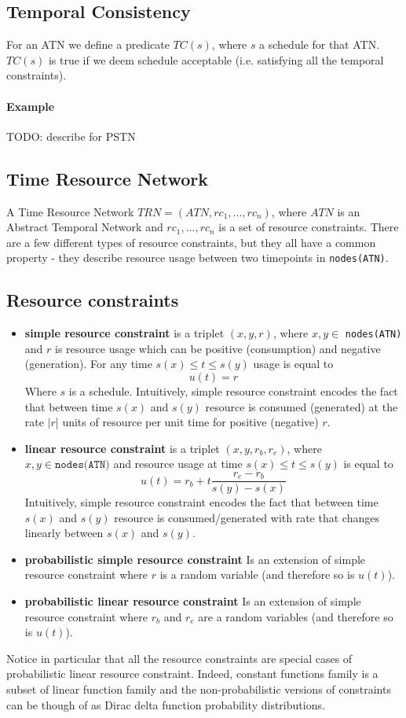 \documentclass{article}
\begin{document}
\begin{multicols}{2}
\subsection{Temporal Consistency}
For an ATN we define a predicate $TC(s)$, where $s$ a schedule for that ATN. $TC(s)$ is true if we deem schedule acceptable (i.e. satisfying all the temporal constraints).
\paragraph{Example} TODO: describe for PSTN
\subsection{Time Resource Network}
A Time Resource Network $TRN = (ATN, {rc_1, ..., rc_n})$, where $ATN$ is an Abstract Temporal Network and ${rc_1, ..., rc_n}$ is a set of resource constraints. There are a few different types of resource constraints, but they all have a common property - they describe resource usage between two timepoints in \texttt{nodes(ATN)}.
\subsection{Resource constraints}
\begin{itemize}
\item \textbf{simple resource constraint} is a triplet $(x, y, r)$, where $x, y \in$ \texttt{nodes(ATN)} and $r$ is resource usage which can be positive (consumption) and negative (generation). For any time $s(x) \leq t \leq s(y)$ usage is equal to
\[
u(t) = r
\]
Where $s$ is a schedule. Intuitively, simple resource constraint encodes the fact that between time $s(x)$ and $s(y)$  resource is consumed (generated) at the rate $|r$| units of resource per unit time for positive (negative) $r$.
\item \textbf{linear resource constraint} is a triplet $(x, y, r_b, r_e)$, where $x, y \in \texttt{nodes(ATN)}$ and resource usage at time $s(x) \leq t \leq s(y)$ is equal to
\[
    u(t) = r_b + t  \frac{r_e - r_b}{s(y) - s(x)}
\]
Intuitively, simple resource constraint encodes the fact that between time $s(x)$ and $s(y)$  resource is consumed/generated with rate that changes linearly between $s(x)$ and $s(y)$.
\item \textbf{probabilistic simple resource constraint}
Is an extension of simple resource constraint where $r$ is a random variable (and therefore so is $u(t)$).
\item \textbf{probabilistic linear resource constraint}
Is an extension of simple resource constraint where $r_b$ and $r_e$ are a random variables (and therefore so is $u(t)$).
\end{itemize}
Notice in particular that all the resource constraints are special cases of probabilistic linear resource constraint. Indeed, constant functions family is a subset of linear function family and the non-probabilistic versions of constraints can be though of as Dirac delta function probability distributions.

\end{multicols}
\end{document}
